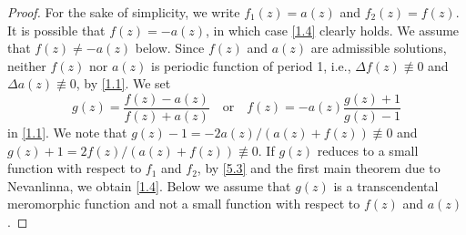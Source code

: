 \documentclass{amsart}
\begin{document}
\begin{proof}
For the sake of simplicity, we write $f_1(z)=a(z)$ and $f_2(z)=f(z)$. It is possible that $f(z)=-a(z)$, in which case \eqref{1.4} clearly holds.
We assume that $f(z)\ne-a(z)$ below.
Since $f(z)$ and $a(z)$ are admissible solutions, neither $f(z)$ nor $a(z)$ is periodic function of period 1, i.e., $\Delta f(z)\not\equiv0$ and $\Delta a(z)\not\equiv0$, by \eqref{1.1}.
We set
\begin{equation}
g(z)=\frac{f(z)-a(z)}{f(z)+a(z)}\quad\text{or}\quad f(z)=-a(z)\frac{g(z)+1}{g(z)-1}\label{5.3}
\end{equation}
in \eqref{1.1}. We note that $g(z)-1=-2a(z)/(a(z)+f(z))\not\equiv0$ and $g(z)+1=2f(z)/(a(z)+f(z))\not\equiv0$.
If $g(z)$ reduces to a small function with respect to $f_1$ and $f_2$, by \eqref{5.3} and the first main theorem due to Nevanlinna, we obtain \eqref{1.4}.
Below we assume that $g(z)$ is a transcendental meromorphic function and not a small function with respect to $f(z)$ and $a(z)$.


\end{proof}
\end{document}
